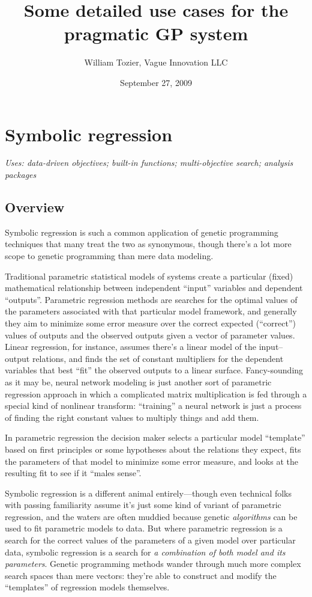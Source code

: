 \documentclass[12pt]{article}
\title{Some detailed use cases for the pragmatic GP system}
\author{William Tozier, Vague Innovation LLC}
\date{September 27, 2009}
\begin{document}
\maketitle
\MakeShortVerb{\|}



\section{Symbolic regression}

\textit{Uses: data-driven objectives; built-in functions; multi-objective search; analysis packages}

\subsection{Overview}

Symbolic regression is such a common application of genetic programming techniques that many treat the two as synonymous, though there's a lot more scope to genetic programming than mere data modeling.

Traditional parametric statistical models of systems create a particular (fixed) mathematical relationship between independent ``input'' variables and dependent ``outputs''. Parametric regression methods are searches for the optimal values of the parameters associated with that particular model framework, and generally they aim to minimize some error measure over the correct expected (``correct'') values of outputs and the observed outputs given a vector of parameter values. Linear regression, for instance, assumes there's a linear model of the input--output relations, and finds the set of constant multipliers for the dependent variables that best ``fit'' the observed outputs to a linear surface. Fancy-sounding as it may be, neural network modeling is just another sort of parametric regression approach in which a complicated matrix multiplication is fed through a special kind of nonlinear transform: ``training'' a neural network is just a process of finding the right constant values to multiply things and add them.

In parametric regression the decision maker selects a particular model ``template'' based on first principles or some hypotheses about the relations they expect, fits the parameters of that model to minimize some error measure, and looks at the resulting fit to see if it ``males sense''.

Symbolic regression is a different animal entirely---though even technical folks with passing familiarity assume it's just some kind of variant of parametric regression, and the waters are often muddied because genetic \emph{algorithms} can be used to fit parametric models to data. But where parametric regression is a search for the correct values of the parameters of a given model over particular data, symbolic regression is a search for \emph{a combination of both model and its parameters}. Genetic programming methods wander through much more complex search spaces than mere vectors: they're able to construct and modify the ``templates'' of regression models themselves.
\end{document}
